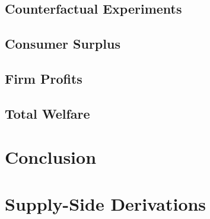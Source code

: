 \documentclass[12pt]{article}
\theoremstyle{definition}
\theoremstyle{remark}
\begin{document}
\subsection{Counterfactual Experiments}

\subsection{Consumer Surplus}

\subsection{Firm Profits}

\subsection{Total Welfare}



\section{Conclusion}
\label{sec:conclusion}








\newpage
\appendix

\section{Supply-Side Derivations}
\label{app:supply}
\allowdisplaybreaks[1]
\end{document}
